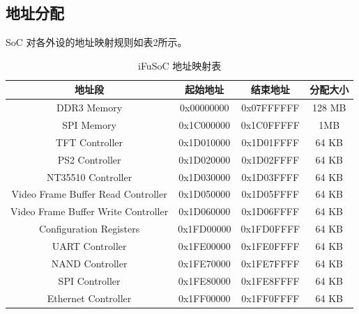 \documentclass{article}
\begin{document}
\subsection{地址分配}
SoC 对各外设的地址映射规则如表2所示。\par
\begin{table}[h]
    \begin{center}
        \begin{tabular}{|c|c|c|c|}
            \hline
            地址段                              & 起始地址    & 结束地址    & 分配大小\\
            \hline
            DDR3 Memory                         & 0x00000000 & 0x07FFFFFF & 128 MB\\
            SPI Memory                          & 0x1C000000 & 0x1C0FFFFF & 1MB\\
            TFT Controller                      & 0x1D010000 & 0x1D01FFFF & 64 KB\\
            PS2 Controller                      & 0x1D020000 & 0x1D02FFFF & 64 KB\\
            NT35510 Controller                  & 0x1D030000 & 0x1D03FFFF & 64 KB\\
            Video Frame Buffer Read Controller  & 0x1D050000 & 0x1D05FFFF & 64 KB\\
            Video Frame Buffer Write Controller & 0x1D060000 & 0x1D06FFFF & 64 KB\\
            Configuration Registers             & 0x1FD00000 & 0x1FD0FFFF & 64 KB\\
            UART Controller                     & 0x1FE00000 & 0x1FE0FFFF & 64 KB\\
            NAND Controller                     & 0x1FE70000 & 0x1FE7FFFF & 64 KB\\
            SPI Controller                      & 0x1FE80000 & 0x1FE8FFFF & 64 KB\\
            Ethernet Controller                 & 0x1FF00000 & 0x1FF0FFFF & 64 KB\\
            \hline
        \end{tabular}
        \caption{iFuSoC 地址映射表}
    \end{center}
\end{table}
\end{document}

